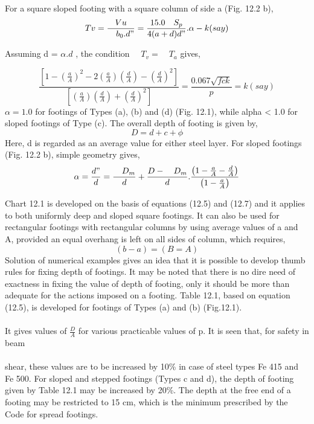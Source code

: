 \documentclass{book}
\begin{document}
 For a square sloped footing with a square column of side a (Fig. 12.2 b),
\begin{equation}
Tv=\frac{Vu}{\quad{b_0}.d "}
=\frac{15.0\quad{S_p}}{4(a+d)d"}.\alpha-k(say)
\end{equation}

Assuming d = $\alpha.d$ , the condition $\quad{T_v}=\quad{T_a}$  gives,

\begin{equation}
\frac{\left[1-\left( \frac{a}{A} \right)^2-2\left(\frac{a}{A}\right)\left(\frac{d}{A}\right)-\left(\frac{d}{A} \right)^2 \right]}
{\left[\left(\frac{a}{A}\right)\left(\frac{d}{A}\right)+\left(\frac{d}{A}\right)^2 \right]}
=\frac{0.067\sqrt{fck}}{p}
=k(say)
\end{equation}
\newpage
$\alpha = 1.0$ for footings of Types (a), (b) and (d) (Fig. 12.1), while alpha < 1.0 for sloped footings of
Type (c). The overall depth of footing is given by,
\begin{equation}
D=d+c+\phi
\end{equation}
Here, d is regarded as an average value for either steel layer. For sloped footings (Fig. 12.2
b), simple geometry gives,
\begin{equation}
\alpha=\frac{d"}{d}=\frac{\quad{D_m}}{d}+\frac{D-\quad{D_m}}{d}.\frac{\left( 1-\frac{a}{A}-\frac{d}{A}\right)}{\left( 1-\frac{a}{A}\right)}
\end{equation}
\par Chart 12.1 is developed on the basis of equations (12.5) and (12.7) and it applies to both
uniformly deep and sloped square footings. It can also be used for rectangular footings with
rectangular columns by using average values of a and A, provided an equal overhang is left
on all sides of column, which requires,
\begin{equation}
(b-a)=(B=A)
\end{equation}
  Solution of numerical examples gives an idea that it is possible to develop thumb rules for fixing depth of footings. It may be noted that there is no dire need of exactness in fixing the value of depth of footing, only it should be more than adequate for the actions imposed on a footing. Table 12.1, based on equation (12.5), is developed for footings of Types (a) and (b) (Fig.12.1).\\\\
 It gives values of $\frac{D}{A}$ for various practicable values of p. It is seen that, for safety in beam\\ \\shear, these values are  to be increased by 10\% in case of steel types Fe 415 and Fe 500. For sloped and stepped footings (Types c and d), the depth of footing given by Table 12.1 may be increased by 20\%. The depth at the free end of a footing may be restricted to 15 cm, which is the minimum prescribed by the Code for spread footings.
 
\end{document}
